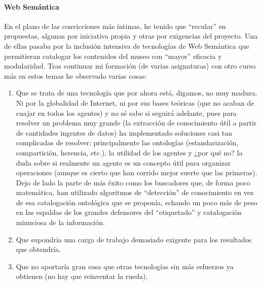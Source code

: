 \paragraph{Web Semántica}
\par En el plano de las convicciones más íntimas, he tenido que ``recular'' en propuestas, algunas por iniciativa propia y otras por exigencias del proyecto. Una de ellas pasaba por la inclusión intensiva de tecnologías de Web Semántica que permitieran catalogar los contenidos del museo con ``mayor'' eficacia y modularidad. Tras continuar mi formación (de varias asignaturas) con otro curso más en estos temas he observado varias cosas:
\begin{enumerate}
 \item Que se trata de una tecnología que por ahora está, digamos, no muy madura. Ni por la globalidad de Internet, ni por sus bases teóricas (que no acaban de cuajar en todos los agentes) y no sé sabe si seguirá adelante, pues para resolver un problema muy grande (la extracción de conocimiento útil a partir de cantidades ingentes de datos) ha implementado soluciones casi tan complicadas de resolver: principalmente las ontologías (estandarización, compartición, herencia, etc.), la utilidad de los agentes y ¿por qué no? la duda sobre si realmente un agente es un concepto útil para organizar operaciones (aunque es cierto que han corrido mejor suerte que las primeras).
Dejo de lado la parte de más éxito como los buscadores que, de forma poco matemática, han utilizado algoritmos de ``detección'' de conocimiento en vez de esa catalogación ontológica que se proponía, echando un poco más de peso en las espaldas de los grandes defensores del ``etiquetado'' y catalogación minuciosa de la información.
  \item Que supondría una carga de trabajo demasiado exigente para los resultados que obtendría.
  \item Que no aportaría gran cosa que otras tecnologías sin más esfuerzos ya obtienen (no hay que reinventar la rueda).
\end{enumerate}

